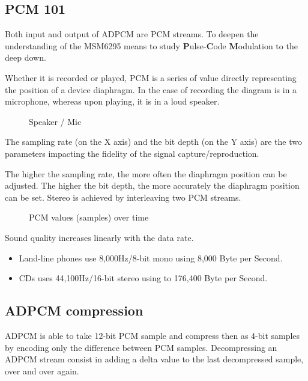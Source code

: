 \subsection{PCM 101}
Both input and output of ADPCM are PCM streams. To deepen the understanding of the MSM6295 means to study \textbf{P}ulse-\textbf{C}ode \textbf{M}odulation to the deep down.

Whether it is recorded or played, PCM is a series of value directly representing the position of a device diaphragm. In the case of recording the diagram is in a microphone, whereas upon playing, it is in a loud speaker.

\pagebreak

\begin{figure}[H]
\caption*{Speaker / Mic}
\end{figure}


The sampling rate (on the X axis) and the bit depth (on the Y axis) are the two parameters impacting the fidelity of the signal capture/reproduction.

The higher the sampling rate, the more often the diaphragm position can be adjusted. The higher the bit depth, the more accurately the diaphragm position can be set. Stereo is achieved by interleaving two PCM streams.

\begin{figure}[H]
\caption*{PCM values (samples) over time}
\end{figure}




Sound quality increases linearly with the data rate.
\begin{itemize}[topsep=0pt]
\item Land-line phones use 8,000Hz/8-bit mono using 8,000 Byte per Second.
\item CDs uses 44,100Hz/16-bit stereo using to 176,400 Byte per Second.
\end{itemize}


\subsection{ADPCM compression}
ADPCM is able to take 12-bit PCM sample and compress then as 4-bit samples by encoding only the difference between PCM samples. Decompressing an ADPCM stream consist in adding a delta value to the last decompressed  sample, over and over again.

